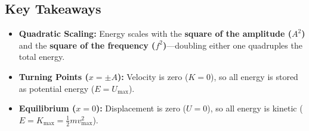 \documentclass[11pt]{article}
\begin{document}
\subsection*{Key Takeaways}
\begin{itemize}
    \item \textbf{Quadratic Scaling:} Energy scales with the \textbf{square of the amplitude ($A^2$)} and the \textbf{square of the frequency ($f^2$)}---doubling either one quadruples the total energy.
    \item \textbf{Turning Points ($x = \pm A$):} Velocity is zero ($K = 0$), so all energy is stored as potential energy ($E = U_{\max}$).
    \item \textbf{Equilibrium ($x = 0$):} Displacement is zero ($U = 0$), so all energy is kinetic ($E = K_{\max} = \frac{1}{2}mv_{\max}^2$).
\end{itemize}
\end{document}
